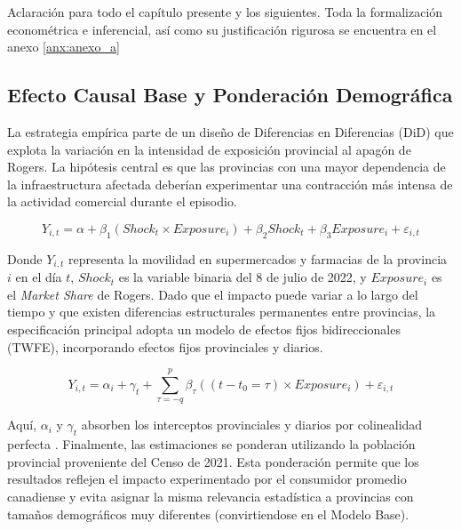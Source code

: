 Aclaración para todo el cap\'itulo presente y los siguientes. Toda la formalizaci\'on econom\'etrica e inferencial, as\'i como su justificaci\'on rigurosa se encuentra en el anexo \ref{anx:anexo_a}

\subsection{Efecto Causal Base y Ponderaci\'on Demogr\'afica}
\label{sec:4_1}

La estrategia emp\'irica parte de un dise\~no de Diferencias en Diferencias 
(DiD) que explota la variaci\'on en la intensidad de exposici\'on provincial al 
apag\'on de Rogers. La hip\'otesis central es que las provincias con una mayor dependencia de la infraestructura afectada deber\'ian experimentar una contracci\'on m\'as intensa de la actividad comercial durante el episodio.

\begin{equation}
    Y_{i,t} = \alpha + \beta_1 \left( Shock_t \times Exposure_i \right) + \beta_2 Shock_t + \beta_3 Exposure_i + \varepsilon_{i,t}
\end{equation}

Donde $Y_{i,t}$ representa la movilidad en supermercados y farmacias de la provincia $i$ en el d\'ia $t$, $Shock_t$ es la variable binaria del 8 de julio de 2022, y $Exposure_i$ es el \textit{Market Share} de Rogers. Dado que el impacto puede variar a lo largo del tiempo y que existen diferencias estructurales permanentes entre provincias, la especificaci\'on principal adopta un modelo de efectos fijos bidireccionales (TWFE), incorporando efectos fijos provinciales y diarios.

\begin{equation}
    Y_{i,t} = \alpha_i + \gamma_t + \sum_{\tau = -q}^{p} \beta_{\tau} \left((t - t_0 = \tau) \times Exposure_i \right) + \varepsilon_{i,t}
\end{equation}

Aqu\'i, $\alpha_i$ y $\gamma_t$ absorben los interceptos provinciales y diarios por colinealidad perfecta \citep{baker2026difference, callaway2021difference}. Finalmente, las estimaciones se ponderan utilizando la poblaci\'on provincial proveniente del Censo de 2021. Esta ponderaci\'on permite que los resultados reflejen el impacto experimentado por el consumidor promedio canadiense y evita asignar la misma relevancia estad\'istica a provincias con tama\~nos demogr\'aficos muy diferentes (convirtiendose en el Modelo Base).

